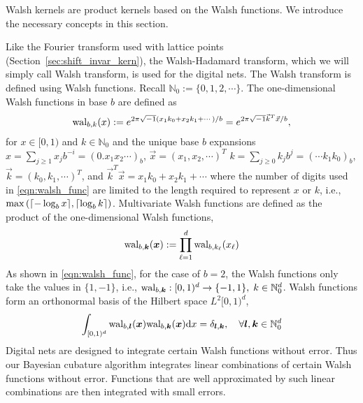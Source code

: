 \documentclass{iitthesis}          %
\newcommand{\bm}[1]{\boldsymbol{#1}}
\newcommand{\dif}[1]{\text{d}{#1}}
\newcommand{\naturals}{\mathbb{N}}
\newcommand{\vk}{\bm{k}}
\newcommand{\vl}{\bm{l}}
\newcommand{\vx}{\bm{x}}
\newcommand{\dx}{\dif{{x}}}
\DeclarePairedDelimiter{\ceil}{\lceil}{\rceil}
\begin{document}

Walsh kernels are product kernels based on the Walsh functions. We introduce the necessary concepts in this section.

Like the Fourier transform used with lattice points (Section~\ref{sec:shift_invar_kern}), the Walsh-Hadamard transform, which we will simply call Walsh transform, is used for the digital nets. The Walsh transform is defined using Walsh functions. Recall $\naturals_0 := \lbrace 0,1,2,\cdots \rbrace$.
The one-dimensional Walsh functions in base $b$ are defined as
\begin{align}
\label{eqn:walsh_func}
\textup{wal}_{b,k}(x) := e^{2\pi \sqrt{-1} (x_1 k_0 + x_2 k_1 + \cdots)/b} 
=
e^{2\pi \sqrt{-1} {\vec{k}}^T{\vec{x}}/b},
\end{align}
for $x \in [0,1)$ and $k \in \naturals_0$ and the unique base $b$ expansions 
$x = \sum_{j \ge 1} x_j b^{-i} = (0.x_1 x_2 \cdots)_b$, $\vec{x} =  (x_1,x_2,\cdots )^T$
$k = \sum_{j \ge 0} k_j b^{j} = ( \cdots k_1 k_0)_b$, $\vec{k} =  (k_0,k_1,\cdots )^T$, and ${\vec{k}}^T{\vec{x}} = x_1 k_0 + x_2 k_1 + \cdots$
where the number of digits used in \eqref{eqn:walsh_func} are limited to the length required to represent $x$ or $k$, i.e., $\max \left( {\ceil{ -\log_b{x}}, \ceil{\log_b{k}}  } \right)$.
Multivariate Walsh functions are defined as the product of the one-dimensional Walsh functions,
\begin{align*}
\textup{wal}_{b,\vk} (\vx) := \prod_{\ell=1}^d \textup{wal}_{b,k_\ell} (x_\ell
)
\end{align*}
As shown in \eqref{eqn:walsh_func}, for the case of $b=2$, the Walsh functions only take the values in $\{1, -1\}$, i.e., $\textup{wal}_{b,\vk} : [0,1)^d \to {\{-1, 1\}} , \; k \in \naturals_0^d$. Walsh functions form an orthonormal basis of the Hilbert space $L^2[0,1)^d$,
\begin{align*}
\int_{[0,1)^d}
\textup{wal}_{b,\vl} (\vx) \textup{wal}_{b,\vk}(\vx) \dx = \delta_{\vl, \vk}, \quad \forall \vl, \vk \in \naturals_0^d
\end{align*}
Digital nets are designed to integrate certain Walsh functions without error.
Thus our Bayesian cubature algorithm integrates linear combinations of %
certain Walsh functions without error. Functions that are well approximated by such linear combinations are then integrated with small errors.
\end{document}
